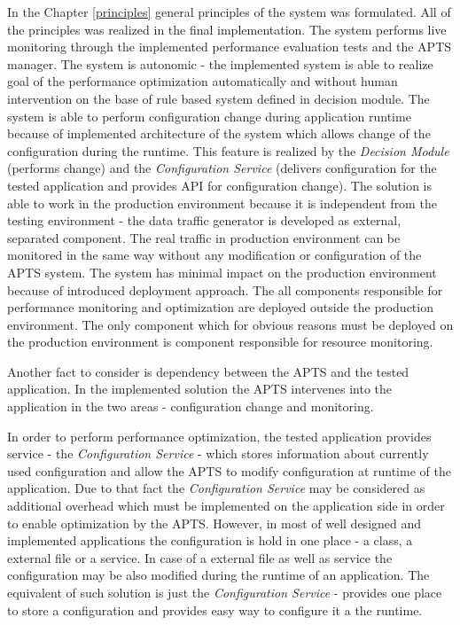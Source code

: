 \documentclass[12pt,a4paper]{article}
\begin{document}
In the Chapter \ref{principles} general principles of the system was formulated. All of the principles was realized in the final implementation. The system performs live monitoring through the implemented performance evaluation tests and the APTS manager. The system is autonomic - the implemented system is able to realize goal of the performance optimization automatically and without human intervention on the base of rule based system defined in decision module. The system is able to perform configuration change during application runtime because of implemented architecture of the system which allows change of the configuration during the runtime. This feature is realized by the \textit{Decision Module} (performs change) and the \textit{Configuration Service} (delivers configuration for the tested application and provides API for configuration change). The solution is able to work in the production environment because it is independent from the testing environment - the data traffic generator is developed as external, separated  component. The real traffic in production environment can be monitored in the same way without any modification or configuration of the APTS system. The system has minimal impact on the production environment because of introduced deployment approach. The all components responsible for performance monitoring and optimization are deployed outside the production environment. The only component which for obvious reasons must be deployed on the production environment is component responsible for resource monitoring.  

Another fact to consider is dependency between the APTS and the tested application. In the implemented solution the APTS intervenes into the application in the two areas - configuration change and monitoring. 

In order to perform performance optimization, the tested application provides service - the \textit{Configuration Service} - which stores information about currently used configuration and allow the APTS to modify configuration at runtime of the application. Due to that fact the \textit{Configuration Service} may be considered as additional overhead which must be implemented on the application side in order to enable optimization by the APTS. However, in most of well designed and implemented applications the configuration is hold in one place - a class, a external file or a service. In case of a external file as well as service the configuration may be also modified during the runtime of an application. The equivalent of such solution is just the \textit{Configuration Service} - provides one place to store a configuration and provides easy way to configure it a the runtime.  
\end{document}
